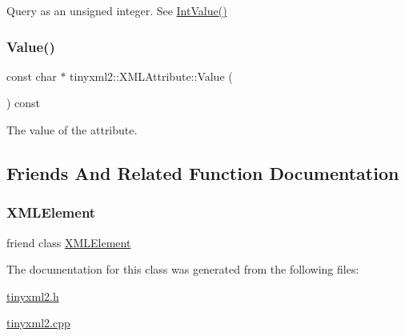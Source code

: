Query as an unsigned integer. See \mbox{\hyperlink{classtinyxml2_1_1_x_m_l_attribute_adfa2433f0fdafd5c3880936de9affa80}{Int\+Value()}} 

\mbox{\label{classtinyxml2_1_1_x_m_l_attribute_ab1c5cd993f836a771818ca408994b14e}} 
\subsubsection{\texorpdfstring{Value()}{Value()}}
{\footnotesize\ttfamily const char $\ast$ tinyxml2\+::\+X\+M\+L\+Attribute\+::\+Value (\begin{DoxyParamCaption}{ }\end{DoxyParamCaption}) const}



The value of the attribute. 



\subsection{Friends And Related Function Documentation}
\mbox{\label{classtinyxml2_1_1_x_m_l_attribute_ac2fba9b6e452829dd892f7392c24e0eb}} 
\subsubsection{\texorpdfstring{X\+M\+L\+Element}{XMLElement}}
{\footnotesize\ttfamily friend class \mbox{\hyperlink{classtinyxml2_1_1_x_m_l_element}{X\+M\+L\+Element}}\hspace{0.3cm}{\ttfamily [friend]}}



The documentation for this class was generated from the following files\+:\begin{DoxyCompactItemize}
\item 
\mbox{\hyperlink{tinyxml2_8h}{tinyxml2.\+h}}\item 
\mbox{\hyperlink{tinyxml2_8cpp}{tinyxml2.\+cpp}}\end{DoxyCompactItemize}
